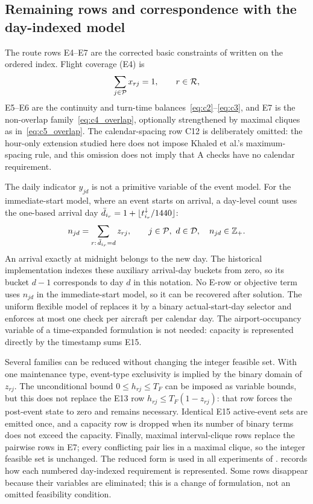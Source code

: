 \subsection{Remaining rows and correspondence with the day-indexed model}
\label{subsec:event_implementation_strengthening}

The route rows E4--E7 are the corrected basic constraints of
 written on the ordered index. Flight coverage (E4) is
\begin{equation}
\sum_{j\in\mathcal{P}}x_{rj}=1,\qquad r\in\mathcal{R},
\label{eq:ordered_c0_c1}
\end{equation}
E5--E6 are the continuity and turn-time balances~\eqref{eq:c2}--\eqref{eq:c3},
and E7 is the non-overlap family~\eqref{eq:c4_overlap}, optionally
strengthened by maximal cliques as in~\eqref{eq:c5_overlap}. The
calendar-spacing row C12 is deliberately omitted: the hour-only extension
studied here does not impose Khaled et al.'s maximum-spacing rule, and this
omission does not imply that A checks have no calendar requirement.

The daily indicator $y_{jd}$ is not a primitive variable of the event model.
For the immediate-start model, where an event starts on arrival, a day-level
count uses the one-based arrival day
$\bar d_{i_r}=1+\lfloor t^{\downarrow}_{i_r}/1440\rfloor$:
\begin{equation}
n_{jd}=\sum_{r:\,\bar d_{i_r}=d}z_{rj},
\qquad j\in\mathcal{P},\ d\in\mathcal{D},\quad n_{jd}\in\mathbb{Z}_{+}.
\label{eq:ordered_c11_recovery}
\end{equation}
An arrival exactly at midnight belongs to the new day. The historical
implementation indexes these auxiliary arrival-day buckets from zero, so its
bucket $d-1$ corresponds to day $d$ in this notation.
No E-row or objective term uses $n_{jd}$ in the immediate-start model, so it
can be recovered after solution. The uniform flexible model of
 replaces it by a binary actual-start-day
selector and enforces at most one check per aircraft per calendar day. The
airport-occupancy variable of a time-expanded formulation is not needed:
capacity is represented directly by the timestamp sums E15.

Several families can be reduced without changing the integer feasible set.
With one maintenance type, event-type exclusivity is implied by the binary
domain of $z_{rj}$. The unconditional bound $0\le h_{rj}\le T_F$ can be
imposed as variable bounds, but this does not replace the E13 row
$h_{rj}\le T_F(1-z_{rj})$: that row forces the post-event state to zero and
remains necessary. Identical E15 active-event sets are emitted once, and a
capacity row is dropped when its number of binary terms does not exceed the
capacity. Finally, maximal
interval-clique rows replace the pairwise rows in E7; every conflicting pair
lies in a maximal clique, so the integer feasible set is unchanged. The
reduced form is used in all experiments of .
 records how each numbered day-indexed requirement is
represented. Some rows disappear because their variables are eliminated; this
is a change of formulation, not an omitted feasibility condition.

